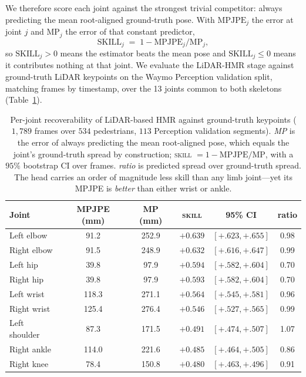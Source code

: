 \documentclass{article} %
\begin{document}
We therefore score each joint against the strongest trivial competitor: always
predicting the mean root-aligned ground-truth pose. With
$\text{MPJPE}_j$ the error at joint $j$ and $\text{MP}_j$ the error of that
constant predictor,
\[
  \mathrm{SKILL}_j \;=\; 1 - \text{MPJPE}_j / \text{MP}_j ,
\]
so $\mathrm{SKILL}_j>0$ means the estimator beats the mean pose and
$\mathrm{SKILL}_j\le 0$ means it contributes nothing at that joint. We evaluate the
LiDAR-HMR stage against ground-truth LiDAR keypoints on the Waymo Perception
validation split, matching frames by timestamp, over the 13 joints common to both
skeletons (Table~\ref{tab:recoverability}).

\begin{table}[t]
\caption{Per-joint recoverability of LiDAR-based HMR against ground-truth
keypoints ($1{,}789$ frames over $534$ pedestrians, $113$ Perception validation
segments). \emph{MP} is the error of always predicting the mean root-aligned pose, which
equals the joint's ground-truth spread by construction; \textsc{skill}
$=1-\text{MPJPE}/\text{MP}$, with a $95\%$ bootstrap CI over frames. \emph{ratio}
is predicted spread over ground-truth spread. The head carries an
order of magnitude less skill than any limb joint---yet its MPJPE is \emph{better}
than either wrist or ankle.}
\label{tab:recoverability}
\begin{center}
\footnotesize
\setlength{\tabcolsep}{4pt}
\begin{tabular}{lccccc}
\toprule
Joint & MPJPE (mm) & MP (mm) & \textsc{skill} & 95\% CI & ratio \\
\midrule
Left elbow     &  91.2 & 252.9 & $+0.639$ & $[+.623,+.655]$ & 0.98 \\
Right elbow    &  91.5 & 248.9 & $+0.632$ & $[+.616,+.647]$ & 0.99 \\
Left hip       &  39.8 &  97.9 & $+0.594$ & $[+.582,+.604]$ & 0.70 \\
Right hip      &  39.8 &  97.9 & $+0.593$ & $[+.582,+.604]$ & 0.70 \\
Left wrist     & 118.3 & 271.1 & $+0.564$ & $[+.545,+.581]$ & 0.96 \\
Right wrist    & 125.4 & 276.4 & $+0.546$ & $[+.527,+.565]$ & 0.99 \\
Left shoulder  &  87.3 & 171.5 & $+0.491$ & $[+.474,+.507]$ & 1.07 \\
Right ankle    & 114.0 & 221.6 & $+0.485$ & $[+.464,+.505]$ & 0.86 \\
Right knee     &  78.4 & 150.8 & $+0.480$ & $[+.463,+.496]$ & 0.91 \\

\end{tabular}
\end{center}
\end{table}
\end{document}
